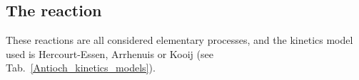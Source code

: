 \subsection{The reaction}
\begin{chemequation}
\end{chemequation}

These reactions are all considered elementary processes, and
the kinetics model used is Hercourt-Essen, Arrhenuis or Kooij
(see Tab.~\ref{Antioch_kinetics_models}).
